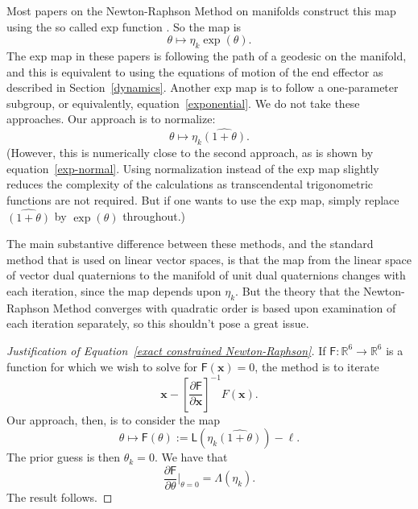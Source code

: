 \documentclass[reqno,12pt]{amsart}
\begin{document}
Most papers on the Newton-Raphson Method on manifolds construct this map using the so called exp function \cite{dedieu-et-al,fernandes-et-al,ferreira-svaiter}.  So the map is
\begin{equation}
\theta \mapsto \eta_k \exp(\theta).
\end{equation}
The exp map in these papers is following the path of a geodesic on the manifold, and this is equivalent to using the equations of motion of the end effector as described in Section~\ref{dynamics}.  Another exp map is to follow a one-parameter subgroup, or equivalently, equation~\eqref{exponential}.  We do not take these approaches.  Our approach is to normalize:
\begin{equation}
\theta \mapsto \eta_k  \widehat{(1 + \theta)}.
\end{equation}
(However, this is numerically close to the second approach, as is shown by equation~\eqref{exp-normal}.  Using normalization instead of the exp map slightly reduces the complexity of the calculations as transcendental trigonometric functions are not required.  But if one wants to use the exp map, simply replace $\widehat{(1+\theta)}$ by $\exp(\theta)$ throughout.)

The main substantive difference between these methods, and the standard method that is used on linear vector spaces,  is that the map from the linear space of vector dual quaternions to the manifold of unit dual quaternions changes with each iteration, since the map depends upon $\eta_k$.  But the theory that the Newton-Raphson Method converges with quadratic order is based upon examination of each iteration separately, so this shouldn't pose a great issue.

\begin{proof}[Justification of Equation~\eqref{exact constrained Newton-Raphson}]
If $\mathsf F:\mathbb R^6 \to \mathbb R^6$ is a function for which we wish to solve for $\mathsf F(\bm x) = 0$, the method is to iterate
\begin{equation}
\bm x - \left[\frac{\partial \mathsf F}{\partial \bm x}\right]^{-1} F(\bm x) .
\end{equation}
Our approach, then, is to consider the map
\begin{equation}
\theta \mapsto \mathsf F(\theta) := \mathsf L(\eta_k \widehat{(1 + \theta)}) - \bm\ell.
\end{equation}
The prior guess is then $\theta_k = 0$.  We have that
\begin{equation}
\frac{\partial \mathsf F}{\partial \theta} \Big|_{\theta = 0} = \mathsf \Lambda(\eta_k) .
\end{equation}
The result follows.
\end{proof}
\end{document}
